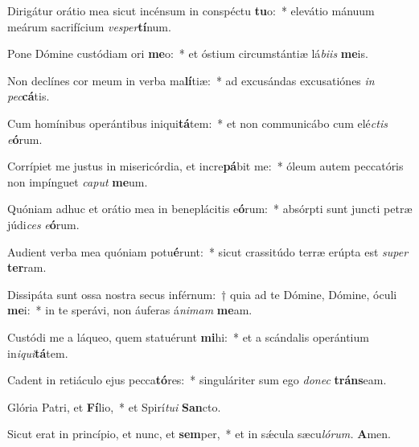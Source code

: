 \item Dirigátur orátio mea sicut incénsum in conspéctu \textbf{tu}o:~* elevátio mánuum meárum sacrifícium \textit{vesper}\textbf{tí}num.
\item Pone Dómine custódiam ori \textbf{me}o:~* et óstium circumstántiæ lá\textit{biis} \textbf{me}is.
\item Non declínes cor meum in verba ma\textbf{lí}tiæ:~* ad excusándas excusatiónes \textit{in} \textit{pec}\textbf{cá}tis.
\item Cum homínibus operántibus iniqui\textbf{tá}tem:~* et non communicábo cum elé\hspace{0.03em}\textit{ctis} \textit{e}\textbf{ó}rum.
\item Corrípiet me justus in misericórdia, et incre\textbf{pá}bit me:~* óleum autem peccatóris non impínguet \textit{caput} \textbf{me}um.
\item Quóniam adhuc et orátio mea in beneplácitis e\textbf{ó}rum:~* absórpti sunt juncti petræ júdi\hspace{0.03em}\textit{ces} \textit{e}\textbf{ó}rum.
\item Audient verba mea quóniam potu\textbf{é}runt:~* sicut crassitúdo terræ erúpta est \textit{super} \textbf{ter}ram.
\item Dissipáta sunt ossa nostra secus inférnum:~† quia ad te Dómine, Dómine, óculi \textbf{me}i:~* in te sperávi, non áuferas á\hspace{0.03em}\textit{nimam} \textbf{me}am.
\item Custódi me a láqueo, quem statuérunt \textbf{mi}hi:~* et a scándalis operántium in\hspace{0.03em}\textit{iqui}\textbf{tá}tem.
\item Cadent in retiáculo ejus pecca\textbf{tó}res:~* singuláriter sum ego \textit{donec} \textbf{tráns}eam.
\item Glória Patri, et \textbf{Fí}lio,~* et Spirí\textit{tui} \textbf{San}cto.
\item Sicut erat in princípio, et nunc, et \textbf{sem}per,~* et in sǽcula sæcu\hspace{0.03em}\textit{lórum.} \textbf{A}men.
